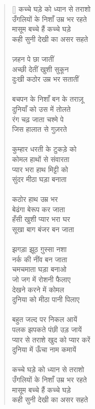 \begin{verse}[\versewidth]\texthindi{
कच्चे घड़े को ध्यान से तराशो\\
उँगलियों के निशाँ उम्र भर रहते\\
मासूम बच्चे हैं कच्चे घड़े\\
कही सुनी देखी का असर सहते\\
\\
ज़हन पे छा जातीं\\
अच्छी देतीं खुशी सुकून\\
दुःखी कठोर उम्र भर सतातीं\\
\\
बचपन के निशाँ बन के तराज़ू\\
दुनियाँ को उस में तोलते\\
रंग चढ़ जाता चश्मे पे\\
जिस हालात से गुज़रते\\
\\
कुम्हार धरती के टुकड़े को\\
कोमल हाथों से संवारता\\
प्यार भरा हाथ मिट्टी को\\
सुंदर मीठा घड़ा बनाता\\
\\
कठोर हाथ उम्र भर \\
बेढंगा बेरूप कर जाता\\
हँसी खुशी प्यार भरा घर\\
सूखा बाग बंजर बन जाता\\
\\
झगड़ा झूठ ग़ुस्सा नशा\\
नर्क की नींव बन जाता\\
चमचमाता घड़ा बनाओ\\
जो जग में रोशनी फैलाए\\
देखने करने में कोमल\\
दुनिया को मीठा पानी पिलाए\\
\\
बहुत जल्द पर निकल आयें\\
पलक झपकते पंछी उड़ जायें\\
प्यार से तराशे खुद को प्यार करें\\
दुनिया में ऊँचा नाम कमायें\\
\\
कच्चे घड़े को ध्यान से तराशो\\
उँगलियों के निशाँ उम्र भर रहते\\
मासूम बच्चे हैं कच्चे घड़े\\
कही सुनी देखी का असर सहते
}\end{verse}

